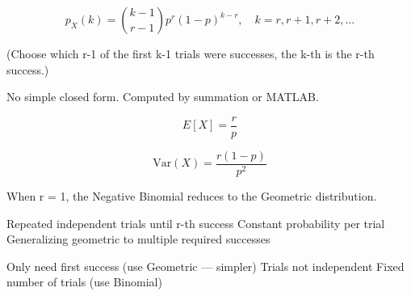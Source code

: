 
\[p_X(k) = \binom{k-1}{r-1} p^r (1-p)^{k-r}, \quad k = r, r+1, r+2, \ldots\]

(Choose which r-1 of the first k-1 trials were successes, the k-th is the r-th success.)


No simple closed form. Computed by summation or MATLAB.


\[E[X] = \frac{r}{p}\]


\[\text{Var}(X) = \frac{r(1-p)}{p^2}\]


When r = 1, the Negative Binomial reduces to the Geometric distribution.


\PSyes{} Repeated independent trials until r-th success\PSbr{}\PSyes{} Constant probability per trial\PSbr{}\PSyes{} Generalizing geometric to multiple required successes


\PSno{} Only need first success (use Geometric — simpler)\PSbr{}\PSno{} Trials not independent\PSbr{}\PSno{} Fixed number of trials (use Binomial)



